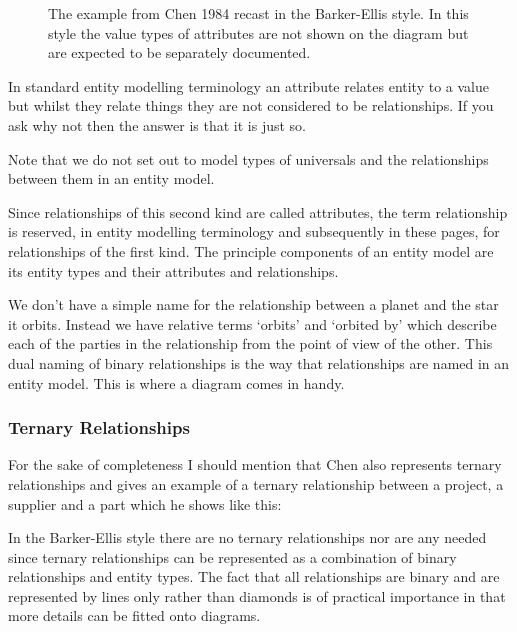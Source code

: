 \begin{figure}

\caption{The example from Chen 1984 recast in the Barker-Ellis style. In this style the value types of attributes are not shown on the diagram but are expected to be 
separately documented. }
\label{projectWorkerAttributesOurStyle}
\end{figure}

\mynote
In standard entity modelling terminology an attribute relates entity to a value but whilst they relate things they are not considered to be relationships. If you ask why not then the answer is that it is just so.
 
\mynote Note that we do not set out to model types of universals and the relationships between them in an entity model. 

\mynote Since relationships of this second kind are called attributes, the term relationship is reserved, in entity modelling terminology and subsequently in these pages, for relationships of the first kind.  The principle components of an entity model are its entity types and their attributes and relationships.

\mynote 
We don't have a simple name for the relationship between a planet and the star it orbits. Instead we have  relative terms `orbits' and `orbited by' which describe each of the parties in the relationship from the point of view of the other. This dual naming of binary relationships is the way that relationships are named in an entity model. 
This is where a diagram comes in handy.
 
\subsubsection*{Ternary Relationships}
For the sake of completeness I should mention that Chen also represents ternary relationships and gives an 
example of a ternary relationship between a project, a supplier and a part which he shows like this:
\begin{center}

\end{center}

In the Barker-Ellis style there are no ternary relationships nor are any needed since ternary relationships can be represented as a combination of binary relationships and entity types. The fact that all relationships are binary and are represented by lines only rather than diamonds  is of practical importance in that more details can be fitted onto diagrams.

